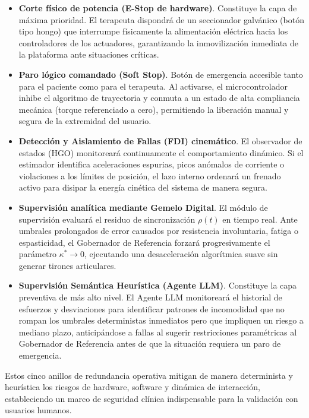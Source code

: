 \documentclass[a4paper,12pt]{article}
\begin{document}
\begin{itemize}
    \item \textbf{Corte físico de potencia (E-Stop de hardware)}. Constituye la capa de máxima prioridad. El terapeuta dispondrá de un seccionador galvánico (botón tipo hongo) que interrumpe físicamente la alimentación eléctrica hacia los controladores de los actuadores, garantizando la inmovilización inmediata de la plataforma ante situaciones críticas.

    \item \textbf{Paro lógico comandado (Soft Stop)}. Botón de emergencia accesible tanto para el paciente como para el terapeuta. Al activarse, el microcontrolador inhibe el algoritmo de trayectoria y conmuta a un estado de alta compliancia mecánica (torque referenciado a cero), permitiendo la liberación manual y segura de la extremidad del usuario.

    \item \textbf{Detección y Aislamiento de Fallas (FDI) cinemático}. El observador de estados (HGO) monitoreará continuamente el comportamiento dinámico. Si el estimador identifica aceleraciones espurias, picos anómalos de corriente o violaciones a los límites de posición, el lazo interno ordenará un frenado activo para disipar la energía cinética del sistema de manera segura.

    \item \textbf{Supervisión analítica mediante Gemelo Digital}. El módulo de supervisión evaluará el residuo de sincronización $\rho(t)$ en tiempo real. Ante umbrales prolongados de error causados por resistencia involuntaria, fatiga o espasticidad, el Gobernador de Referencia forzará progresivamente el parámetro $\kappa^{*} \to 0$, ejecutando una desaceleración algorítmica suave sin generar tirones articulares.

    \item \textbf{Supervisión Semántica Heurística (Agente LLM)}. Constituye la capa preventiva de más alto nivel. El Agente LLM monitoreará el historial de esfuerzos y desviaciones para identificar patrones de incomodidad que no rompan los umbrales deterministas inmediatos pero que impliquen un riesgo a mediano plazo, anticipándose a fallas al sugerir restricciones paramétricas al Gobernador de Referencia antes de que la situación requiera un paro de emergencia.
\end{itemize}

Estos cinco anillos de redundancia operativa mitigan de manera determinista y heurística los riesgos de hardware, software y dinámica de interacción, estableciendo un marco de seguridad clínica indispensable para la validación con usuarios humanos.
\end{document}
